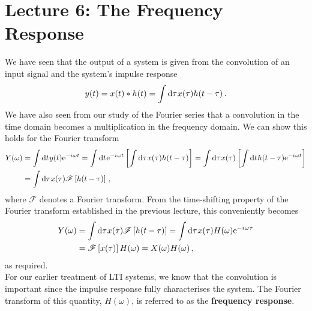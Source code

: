 \section{Lecture 6: The Frequency Response}

We have seen that the output of a system is given from the
convolution of an input signal and the system's impulse response
%
\begin{displaymath}
  y(t) = x(t) * h(t) = \int\mathrm{d}\tau\mkern1mux(\tau)h(t-\tau) \,.
\end{displaymath}
%
We have also seen from our study of the Fourier series that a
convolution in the time domain becomes a multiplication in the
frequency domain. We can show this holds for the Fourier transform
%
\begin{align*}
  Y(\omega) &= \int\mathrm{d}t\mkern1mu y(t)\mathrm{e}^{-{i\mkern1mu}\omega t}
  = \int\mathrm{d}t\mkern1mu\mathrm{e}^{-{i\mkern1mu}\omega t}\left[\int\mathrm{d}\tau\mkern1mux(\tau)h(t-\tau)\right]
  = \int\mathrm{d}\tau\mkern1mux(\tau)\left[\int\mathrm{d}t\mkern1muh(t-\tau)\mathrm{e}^{-{i\mkern1mu}\omega t}\right] \\
  &= \int \mathrm{d}\tau\mkern1mux(\tau)\mathscr{F}\left[h(t-\tau)\right] \,,
\end{align*}
%
where $\mathscr{F}$ denotes a Fourier transform. From the time-shifting
property of the Fourier transform established in the previous lecture,
this conveniently becomes
%
\begin{align*}
  Y(\omega) &= \int \mathrm{d}\tau\mkern1mux(\tau)\mathscr{F}\left[h(t-\tau)\right]
  = \int \mathrm{d}\tau\mkern1mux(\tau)H(\omega)\mathrm{e}^{-{i\mkern1mu}\omega\tau} \\
  &= \mathscr{F}\left[x(\tau)\right]H(\omega) = X(\omega)H(\omega) \,,
\end{align*}
%
as required.\\

For our earlier treatment of LTI systems, we know that the convolution
is important since the impulse response fully characterises the system.
The Fourier transform of this quantity, $H(\omega)$, is referred to as
the \textbf{frequency response}.


